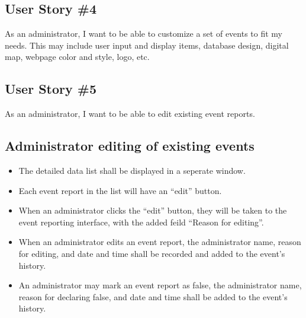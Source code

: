 \subsection{User Story \#4} 
As an administrator, I want to be able to customize a set of events to fit my needs. This may include user input and display items, database design, digital map, webpage color and style, logo, etc. 
\subsection{User Story \#5} 
As an administrator, I want to be able to edit existing event reports.

\subsection{Administrator editing of existing events}
\begin{itemize}
\item The detailed data list shall be displayed in a seperate window.
\item Each event report in the list will have an ``edit'' button.
\item When an administrator clicks the ``edit'' button, they will be taken to the event reporting interface, with the added feild ``Reason for editing''.
\item When an administrator edits an event report, the administrator name, reason for editing, and date and time shall be recorded and added to the event's history.
\item An administrator may mark an event report as false, the administrator name, reason for declaring false, and date and time shall be added to the event's history.
\end{itemize}

